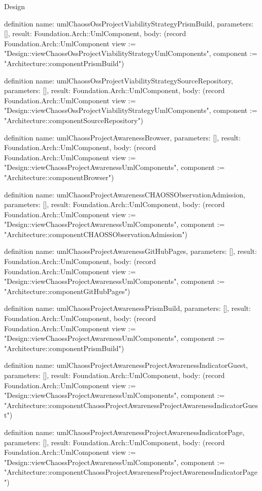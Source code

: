 \begin{lexlean}{Design}
\begin{semanticmodule}
definition{
  name: umlChaossOssProjectViabilityStrategyPrismBuild,
  parameters: [],
  result: Foundation.Arch::UmlComponent,
  body: (record Foundation.Arch::UmlComponent {view := "Design::viewChaossOssProjectViabilityStrategyUmlComponents", component := "Architecture::componentPrismBuild"})
}

definition{
  name: umlChaossOssProjectViabilityStrategySourceRepository,
  parameters: [],
  result: Foundation.Arch::UmlComponent,
  body: (record Foundation.Arch::UmlComponent {view := "Design::viewChaossOssProjectViabilityStrategyUmlComponents", component := "Architecture::componentSourceRepository"})
}

definition{
  name: umlChaossProjectAwarenessBrowser,
  parameters: [],
  result: Foundation.Arch::UmlComponent,
  body: (record Foundation.Arch::UmlComponent {view := "Design::viewChaossProjectAwarenessUmlComponents", component := "Architecture::componentBrowser"})
}

definition{
  name: umlChaossProjectAwarenessCHAOSSObservationAdmission,
  parameters: [],
  result: Foundation.Arch::UmlComponent,
  body: (record Foundation.Arch::UmlComponent {view := "Design::viewChaossProjectAwarenessUmlComponents", component := "Architecture::componentCHAOSSObservationAdmission"})
}

definition{
  name: umlChaossProjectAwarenessGitHubPages,
  parameters: [],
  result: Foundation.Arch::UmlComponent,
  body: (record Foundation.Arch::UmlComponent {view := "Design::viewChaossProjectAwarenessUmlComponents", component := "Architecture::componentGitHubPages"})
}

definition{
  name: umlChaossProjectAwarenessPrismBuild,
  parameters: [],
  result: Foundation.Arch::UmlComponent,
  body: (record Foundation.Arch::UmlComponent {view := "Design::viewChaossProjectAwarenessUmlComponents", component := "Architecture::componentPrismBuild"})
}

definition{
  name: umlChaossProjectAwarenessProjectAwarenessIndicatorGuest,
  parameters: [],
  result: Foundation.Arch::UmlComponent,
  body: (record Foundation.Arch::UmlComponent {view := "Design::viewChaossProjectAwarenessUmlComponents", component := "Architecture::componentChaossProjectAwarenessProjectAwarenessIndicatorGuest"})
}

definition{
  name: umlChaossProjectAwarenessProjectAwarenessIndicatorPage,
  parameters: [],
  result: Foundation.Arch::UmlComponent,
  body: (record Foundation.Arch::UmlComponent {view := "Design::viewChaossProjectAwarenessUmlComponents", component := "Architecture::componentChaossProjectAwarenessProjectAwarenessIndicatorPage"})
}


\end{semanticmodule}
\end{lexlean}
